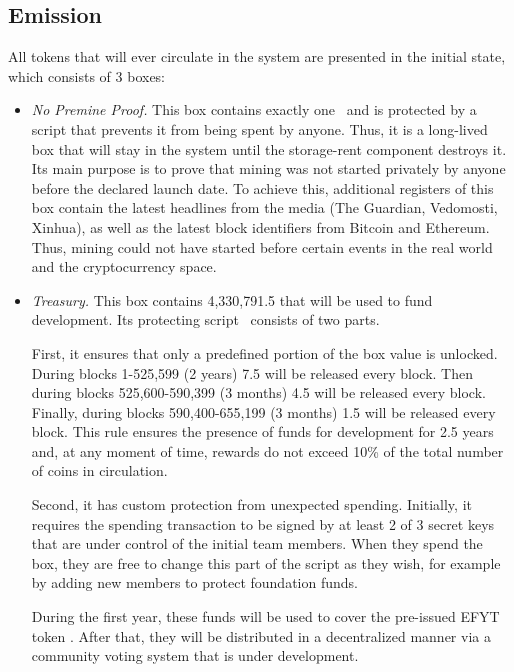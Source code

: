 \subsection{Emission}
\label{sec:emission}


All \Erg{} tokens that will ever circulate in the system are presented in the initial state, which consists of 3 boxes:

\begin{itemize}
    \item{\em No Premine Proof.} This box contains exactly one~\Erg{} and is protected by a script that prevents it from being spent by anyone.
    Thus, it is a long-lived box that will stay in the system until the storage-rent component
    destroys it.
    Its main purpose is to prove that \Ergo{} mining was not started privately by anyone before
    the declared launch date.
    To achieve this, additional registers of this box contain the latest headlines from the media (The Guardian, Vedomosti, Xinhua), as well as the latest block identifiers from Bitcoin and Ethereum.
    Thus, \Ergo{} mining could not have started before certain events in the real world and the cryptocurrency space.

    \item{\em Treasury.} This box contains 4,330,791.5 \Erg{} that will be used to fund \Ergo{}
    development.
    Its protecting script~\cite{scriptTreasury} consists of two parts.

    First, it ensures that only a predefined portion of the box value is unlocked.
    During blocks 1-525,599 (2 years) 7.5 \Erg{} will be released every block. Then during blocks 525,600-590,399 (3 months) 4.5 \Erg{} will be released every block. Finally,
    during blocks 590,400-655,199 (3 months) 1.5 \Erg{} will be released every block.
    This rule ensures the presence of funds for \Ergo{} development for 2.5 years and, at any moment of time,
    rewards do not exceed 10\% of the total number of coins in circulation.

    Second, it has custom protection from unexpected spending.
    Initially, it requires the spending transaction to be signed by at least 2 of 3 secret keys that are under control of the initial team members. When they spend the box, they are free to
    change this part of the script as they wish, for example by adding new members to protect foundation
    funds.

    During the first year, these funds will be used to cover the pre-issued EFYT token%
. After that, they will be distributed in a decentralized manner via a community voting system that is under development.



\end{itemize}
